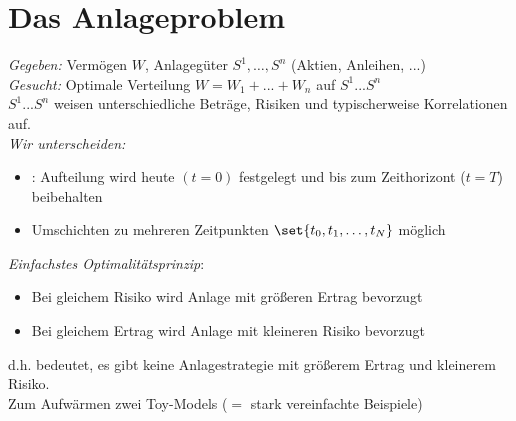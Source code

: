 \section{Das Anlageproblem}
\emph{Gegeben:} Vermögen $W$, Anlagegüter $S^1, \dots, S^n$ (Aktien, Anleihen, ...)\\
\emph{Gesucht:} Optimale Verteilung $W = W_1 + ... + W_n$ auf $S^1 ... S^n$\\
$S^1 ... S^n$ weisen unterschiedliche Beträge, Risiken und typischerweise  Korrelationen auf.\\
\emph{Wir unterscheiden:}
\begin{itemize}
	\item {}: Aufteilung wird heute $(t=0)$ festgelegt und bis zum Zeithorizont ($t=T$) beibehalten
	\item {} Umschichten zu mehreren Zeitpunkten $\set{t_0, t_1, \dots, t_N}$ möglich
\end{itemize}
\emph{Einfachstes Optimalitätsprinzip}: 
\begin{itemize}
	\item Bei gleichem Risiko wird Anlage mit größeren Ertrag bevorzugt
	\item Bei gleichem Ertrag wird Anlage mit kleineren Risiko bevorzugt
\end{itemize}
d.h.  bedeutet, es gibt keine Anlagestrategie mit größerem Ertrag und kleinerem Risiko.\\
Zum Aufwärmen zwei Toy-Models ($=$ stark vereinfachte Beispiele)
